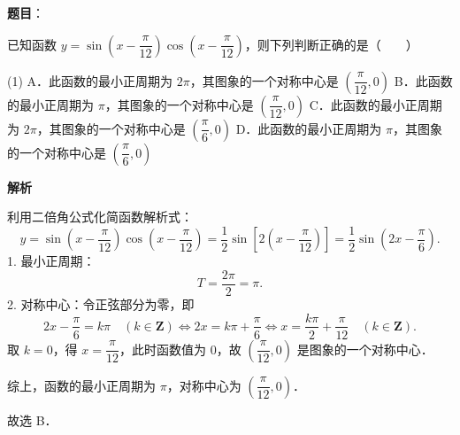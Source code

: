 \begin{answer}

\textbf{题目}：

已知函数 $y = \sin\left(x - \dfrac{\pi}{12}\right)\cos\left(x - \dfrac{\pi}{12}\right)$，则下列判断正确的是\mbox{（　　）}

\begin{gkopts}(1)
\task A．此函数的最小正周期为 $2\pi$，其图象的一个对称中心是 $\left(\dfrac{\pi}{12}, 0\right)$
\task B．此函数的最小正周期为 $\pi$，其图象的一个对称中心是 $\left(\dfrac{\pi}{12}, 0\right)$
\task C．此函数的最小正周期为 $2\pi$，其图象的一个对称中心是 $\left(\dfrac{\pi}{6}, 0\right)$
\task D．此函数的最小正周期为 $\pi$，其图象的一个对称中心是 $\left(\dfrac{\pi}{6}, 0\right)$
\end{gkopts}

\textbf{解析}

利用二倍角公式化简函数解析式：
\nopagebreak[4]
\[
y = \sin\left(x - \dfrac{\pi}{12}\right)\cos\left(x - \dfrac{\pi}{12}\right) = \dfrac{1}{2}\sin\left[2\left(x - \dfrac{\pi}{12}\right)\right] = \dfrac{1}{2}\sin\left(2x - \dfrac{\pi}{6}\right).
\]
1. 最小正周期：
\nopagebreak[4]
\[
T = \dfrac{2\pi}{2} = \pi.
\]
2. 对称中心：令正弦部分为零，即
\nopagebreak[4]
\[
2x - \dfrac{\pi}{6} = k\pi \quad (k \in \mathbf{Z}) \iff 2x = k\pi + \dfrac{\pi}{6} \iff x = \dfrac{k\pi}{2} + \dfrac{\pi}{12} \quad (k \in \mathbf{Z}).
\]
取 $k = 0$，得 $x = \dfrac{\pi}{12}$，此时函数值为 $0$，故 $\left(\dfrac{\pi}{12}, 0\right)$ 是图象的一个对称中心．

综上，函数的最小正周期为 $\pi$，对称中心为 $\left(\dfrac{\pi}{12}, 0\right)$．

故选 B．


\end{answer}
